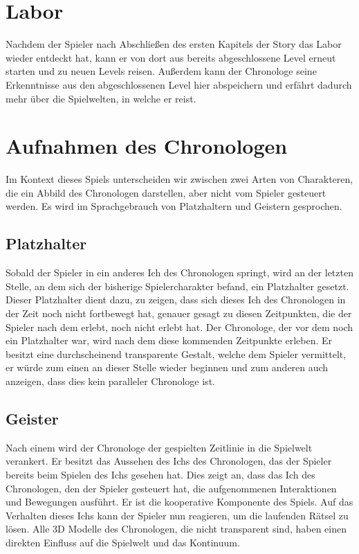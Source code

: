 \section{Labor}
Nachdem der Spieler nach Abschließen des ersten Kapitels der Story das Labor wieder entdeckt hat, kann er von dort aus bereits abgeschlossene Level erneut starten und zu neuen Levels reisen. Außerdem kann der Chronologe seine Erkenntnisse aus den abgeschlossenen Level hier abspeichern und erfährt dadurch mehr über die Spielwelten, in welche er reist.

\section{Aufnahmen des Chronologen}\label{sec:npc}
Im Kontext dieses Spiels unterscheiden wir zwischen zwei Arten von  Charakteren, die ein Abbild des Chronologen darstellen, aber nicht vom Spieler gesteuert werden. Es wird im Sprachgebrauch von Platzhaltern und Geistern gesprochen.

\subsection{Platzhalter}
Sobald der Spieler in ein anderes Ich des Chronologen springt, wird an der letzten Stelle, an dem sich der bisherige Spielercharakter befand, ein Platzhalter gesetzt. Dieser Platzhalter dient dazu, zu zeigen, dass sich dieses Ich des Chronologen in der Zeit noch nicht fortbewegt hat, genauer gesagt zu diesen Zeitpunkten, die der Spieler nach dem  erlebt, noch nicht erlebt hat. Der Chronologe, der vor dem  noch ein Platzhalter war, wird nach dem  diese kommenden Zeitpunkte erleben. Er besitzt eine durchscheinend transparente Gestalt, welche dem Spieler vermittelt, er würde zum einen an dieser Stelle wieder beginnen und zum anderen auch anzeigen, dass dies kein paralleler Chronologe ist.

\subsection{Geister}
Nach einem  wird der Chronologe der gespielten Zeitlinie in die Spielwelt verankert.
Er besitzt das Aussehen des Ichs des Chronologen, das der Spieler bereits beim Spielen des Ichs gesehen hat. Dies zeigt an, dass das Ich des Chronologen, den der Spieler gesteuert hat, die aufgenommenen Interaktionen und Bewegungen ausführt. Er ist die kooperative Komponente des Spiels. Auf das Verhalten dieses Ichs kann der Spieler nun reagieren, um die laufenden Rätsel zu lösen. 
Alle 3D Modelle des Chronologen, die nicht transparent sind, haben einen direkten Einfluss auf die Spielwelt und das Kontinuum.

